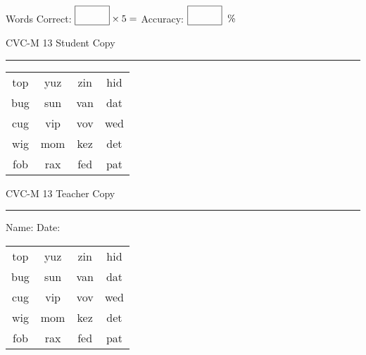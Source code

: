 \documentclass{memoir}
\begin{document}
\small

Words Correct: $\fbox{\phantom{\huge 100}} \times 5 = $ Accuracy: $\fbox{\phantom{\huge 100}}\;\; \%$ 

\vfill

\newpage


\footnotesize \noindent
CVC-M 13 \hfill Student Copy
\smallskip
\hrule

\Large

\setlength{\tabcolsep}{14pt}
\def\arraystretch{2}

{\selectfont


\begin{vplace}[0.5]
\begin{center}
\begin{tabular}{cccc}
top & yuz & zin & hid \\
bug & sun & van & dat \\
cug & vip & vov & wed \\
wig & mom & kez & det \\
fob & rax & fed & pat \\
\end{tabular}
\end{center}
\end{vplace}

}

\newpage

\footnotesize \noindent
CVC-M 13 \hfill Teacher Copy
\smallskip
\hrule

\small

\vfill

\noindent
Name: \underline{\hspace{1.75in}} \hfill Date: \underline{\hspace{1in}}

\Large

{\selectfont


\begin{vplace}[0.5]
\begin{center}
\begin{tabular}{cccc}
top & yuz & zin & hid \\
bug & sun & van & dat \\
cug & vip & vov & wed \\
wig & mom & kez & det \\
fob & rax & fed & pat \\
\end{tabular}
\end{center}
\end{vplace}



}
\end{document}
